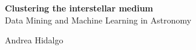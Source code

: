 \begingroup
\thispagestyle{empty}
\centering
\vspace*{5cm}
\par\normalfont\fontsize{35}{35}\sffamily\selectfont
\textbf{Clustering the interstellar medium}\\
{\LARGE Data Mining and Machine Learning in Astronomy}\par %
\vspace*{1cm}
{\Huge Andrea Hidalgo}\par %
\endgroup